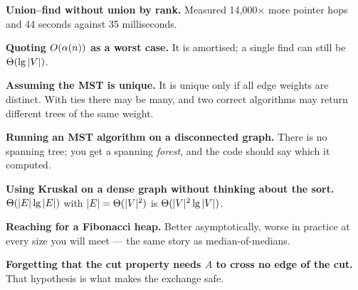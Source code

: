 \begin{pitfall}
\begin{tight}
  \item \textbf{Union--find without union by rank.} Measured 14{,}000$\times$
        more pointer hops and 44 seconds against 35 milliseconds.
  \item \textbf{Quoting $O(\alpha(n))$ as a worst case.} It is amortised; a
        single find can still be $\Theta(\operatorname{lg}|V|)$.
  \item \textbf{Assuming the MST is unique.} It is unique only if all edge
        weights are distinct. With ties there may be many, and two correct
        algorithms may return different trees of the same weight.
  \item \textbf{Running an MST algorithm on a disconnected graph.} There is no
        spanning tree; you get a spanning \emph{forest}, and the code should
        say which it computed.
  \item \textbf{Using Kruskal on a dense graph without thinking about the
        sort.} $\Theta(|E|\operatorname{lg}|E|)$ with $|E| = \Theta(|V|^{2})$ is
        $\Theta(|V|^{2}\operatorname{lg}|V|)$.
  \item \textbf{Reaching for a Fibonacci heap.} Better asymptotically, worse in
        practice at every size you will meet --- the same story as
        median-of-medians.
  \item \textbf{Forgetting that the cut property needs $A$ to cross no edge of
        the cut.} That hypothesis is what makes the exchange safe.
\end{tight}
\end{pitfall}

